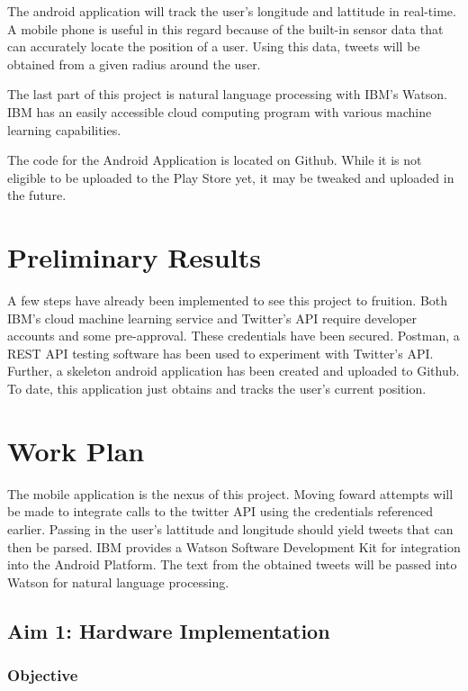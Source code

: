 \documentclass[12pt, oneside]{article}
\begin{document}
The android application will track the user's longitude and lattitude in real-time. A mobile phone is useful in this regard because of the built-in sensor data that can accurately locate the position of a user. Using this data, tweets will be obtained from a given radius around the user.

The last part of this project is natural language processing with IBM's Watson.
IBM has an easily accessible cloud computing program with various machine learning capabilities\cite{IBM}.

The code for the Android Application is located on Github. While it is not
eligible to be uploaded to the Play Store yet, it may be tweaked and uploaded
in the future\cite{Git}.

\section{Preliminary Results}
A few steps have already been implemented to see this project to fruition. Both
IBM's cloud machine learning service and Twitter's API require developer
accounts and some pre-approval. These credentials have been secured.
Postman, a REST API testing software has been used to experiment with Twitter's
API\cite{Postman}.
Further, a
skeleton android application has been created and uploaded to Github. To date,
this application just obtains and tracks the user's current position.

\section{Work Plan}
The mobile application is the nexus of this project. Moving foward attempts will be made to integrate calls to the twitter API using the credentials referenced earlier. Passing in the user's lattitude and longitude should yield tweets that can then be parsed. IBM provides a Watson Software Development Kit for integration into the Android Platform. The text from the obtained tweets will be passed into Watson for natural language processing.  

\subsection{Aim 1: Hardware Implementation}

\subsubsection{Objective}
\end{document}
